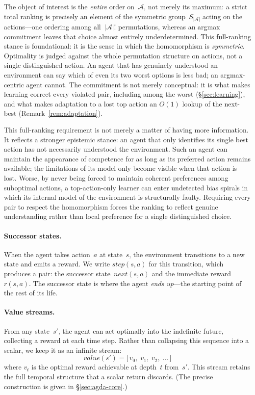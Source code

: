 \documentclass[runningheads]{llncs}
\begin{document}
The object of interest is the \emph{entire} order on~$\mathcal{A}$, not merely its maximum: a strict total ranking is precisely an element of the symmetric group~$S_{|\mathcal{A}|}$ acting on the actions---one ordering among all~$|\mathcal{A}|!$ permutations, whereas an argmax commitment leaves that choice almost entirely underdetermined.  This full-ranking stance is foundational: it is the sense in which the homomorphism is \emph{symmetric}.  Optimality is judged against the whole permutation structure on actions, not a single distinguished action.  An agent that has genuinely understood an environment can say which of even its two worst options is less bad; an argmax-centric agent cannot.  The commitment is not merely conceptual: it is what makes learning correct every violated pair, including among the worst (\S\ref{sec:learning}), and what makes adaptation to a lost top action an $O(1)$ lookup of the next-best (Remark~\ref{rem:adaptation}).

This full-ranking requirement is not merely a matter of having more information. It reflects a stronger epistemic stance: an agent that only identifies its single best action has not necessarily understood the environment. Such an agent can maintain the appearance of competence for as long as its preferred action remains available; the limitations of its model only become visible when that action is lost. Worse, by never being forced to maintain coherent preferences among suboptimal actions, a top-action-only learner can enter undetected bias spirals in which its internal model of the environment is structurally faulty. Requiring every pair to respect the homomorphism forces the ranking to reflect genuine understanding rather than local preference for a single distinguished choice.

\paragraph{Successor states.}
When the agent takes action~$a$ at state~$s$, the environment transitions to a new state and emits a reward.
We write $\mathit{step}(s,a)$ for this transition, which produces a pair: the successor state~$\mathit{next}(s,a)$ and the immediate reward~$r(s,a)$.
The successor state is where the agent \emph{ends up}---the starting point of the rest of its life.

\paragraph{Value streams.}
From any state~$s'$, the agent can act optimally into the indefinite future, collecting a reward at each time step.
Rather than collapsing this sequence into a scalar, we keep it as an infinite stream:
\[
\mathit{value}(s') = \bigl[\, v_0,\; v_1,\; v_2,\; \ldots \,\bigr]
\]
where $v_t$ is the optimal reward achievable at depth~$t$ from~$s'$.
This stream retains the full temporal structure that a scalar return discards.
(The precise construction is given in \S\ref{sec:agda-core}.)
\end{document}
